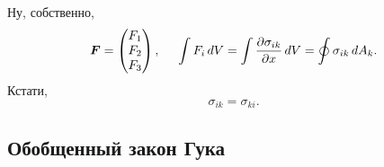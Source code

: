 \begin{minipage}[c]{0.5\textwidth}
    
Ну, собственно,
$$
    \mbox{\boldmath $F$} = \begin{pmatrix}
        F_1 \\ F_2 \\ F_3
    \end{pmatrix}, \hspace{0.5cm} 
    \int F_i \, d V = \int \frac{\partial \sigma_{ik}}{\partial x} \, d V =
    \oint \sigma_{ik} \, d A_k
    .
$$
Кстати, 
\begin{equation}
    \sigma_{ik} = \sigma_{ki}.
\end{equation}


\end{minipage}
\hfill
\begin{minipage}[c]{0.4\textwidth}
    \begin{center}
    \end{center}
\end{minipage}



\subsection{Обобщенный закон Гука}

